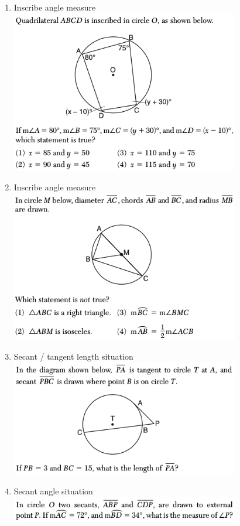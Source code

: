 \documentclass[12pt, oneside]{article}
\begin{document}
\begin{enumerate}[itemsep=1.2cm]
\item Inscribe angle measure\\
\includegraphics[width=10cm]{R-2images/R-2chordsJ.png}
\vspace{1cm}

\item Inscribe angle measure\\
\includegraphics[width=10cm]{R-2images/R-2chordsK.png}
\vspace{1cm}

\item Secant / tangent length situation\\
\includegraphics[width=10cm]{R-2images/R-2secantsA.png}
\vspace{1cm}

\item Secant angle situation\\
\includegraphics[width=10cm]{R-2images/R-2secantsB.png}
\vspace{1cm}

\end{enumerate}
\end{document}
